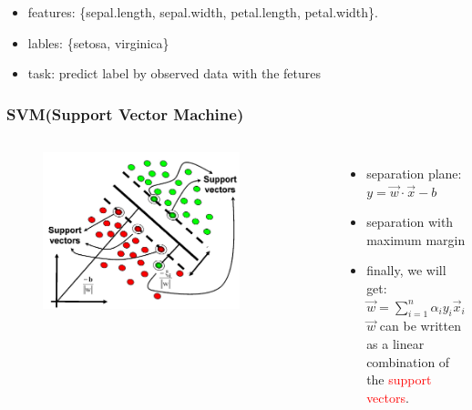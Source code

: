 \documentclass{beamer}
\begin{document}
\begin{frame}
	\begin{itemize}
		\item features: \{sepal.length, sepal.width, petal.length, petal.width\}. 
		\item lables: \{setosa, virginica\}
		\item task: predict label by observed data with the fetures
	\end{itemize}	
	
	
\end{frame}


\begin{frame}
	\frametitle{SVM(Support Vector Machine)}
	\begin{columns}[c] %
	
	\begin{figure}
		\includegraphics[width=0.8\textwidth]{figs/fig1_svm.png}
		
	\end{figure}
	
		\begin{itemize}
		\item separation plane: $y = \vec{w} \cdot \vec{x} - b$
		\item separation with maximum margin
		\item finally, we will get: \\
		$\vec w = \sum_{i=1}^n \alpha_iy_i \vec x_i$	\\
		$\vec w$ can be written as a linear combination of the \textcolor{red}{support vectors}.
		\end{itemize}			
	\end{columns}	
	

\end{frame}
\end{document}
